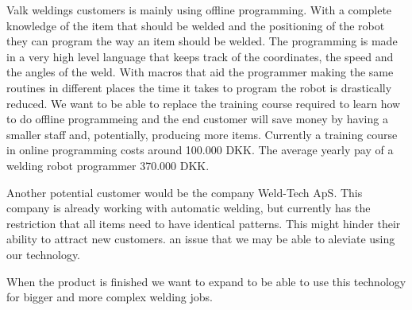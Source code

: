 Valk weldings customers is mainly using offline programming.
With a complete knowledge of the item that should be welded and the positioning of the robot they can program the way an item should be welded.
The programming is made in a very high level language that keeps track of the coordinates, the speed and the angles of the weld.
With macros that aid the programmer making the same routines in different places the time it takes to program the robot is drastically reduced.
We want to be able to replace the training course required to learn how to do offline programmeing and the end customer will save money by having a smaller staff and, potentially, producing more items. 
Currently a training course in online programming costs around 100.000 DKK\cite{valk_welding_summary}. 
The average yearly pay of a welding robot programmer 370.000 DKK\cite{welding_salary}. 

Another potential customer would be the company Weld-Tech ApS. 
This company is already working with automatic welding, but currently has the restriction that all items need to have identical patterns. 
This might hinder their ability to attract new customers. an issue that we may be able to aleviate using our technology.

When the product is finished we want to expand to be able to use this technology for bigger and more complex welding jobs.

